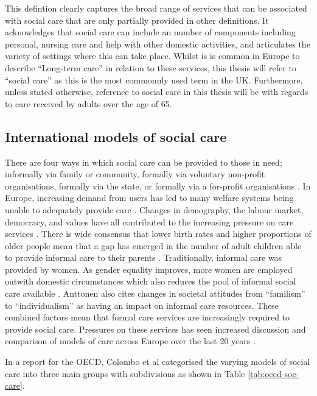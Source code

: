 \documentclass[12pt,]{report}
\begin{document}
This defintion clearly captures the broad range of services that can be
associated with social care that are only partially provided in other
definitions. It acknowledges that social care can include an number of
components including personal, nursing care and help with other domestic
activities, and articulates the variety of settings where this can take
place. Whilst is is common in Europe to describe ``Long-term care'' in
relation to these services, this thesis will refer to ``social care'' as
this is the most commonnly used term in the UK. Furthermore, unless
stated otherwise, reference to social care in this thesis will be with
regards to care received by adults over the age of 65.

\subsection{International models of social care}\label{subsec:access-sc-models}

There are four ways in which social care can be provided to those in
need; informally via family or community, formally via voluntary
non-profit organisations, formally via the state, or formally via a
for-profit organisations \citep{RN346}. In Europe, increasing demand
from users has led to many welfare systems being unable to adequately
provide care \citep{RN344, RN414}. Changes in demography, the labour
market, democracy, and values have all contributed to the increasing
pressure on care services \citep{RN406, RN342, RN414}. There is wide
consensus that lower birth rates and higher proportions of older people
mean that a gap has emerged in the number of adult children able to
provide informal care to their parents
\citep{RN342, RN343, RN344, RN346, RN345, RN414}. Traditionally,
informal care was provided by women. As gender equality improves, more
women are employed outwith domestic circumstances which also reduces the
pool of informal social care available \citep{RN342}. Anttonen
\citeyearpar{RN342} also cites changes in societal attitudes from
``familism'' to ``individualism'' as having an impact on informal care
resources. These combined factors mean that formal care services are
increasingly required to provide social care. Pressures on these
services has seen increased discussion and comparison of models of care
across Europe over the last 20 years \citep{RN347, RN348, RN346, RN349}.

In a report for the OECD, Colombo et al \citeyearpar{RN414} categorised
the varying models of social care into three main groups with
subdivisions as shown in Table \ref{tab:oecd-soc-care}.
\end{document}
